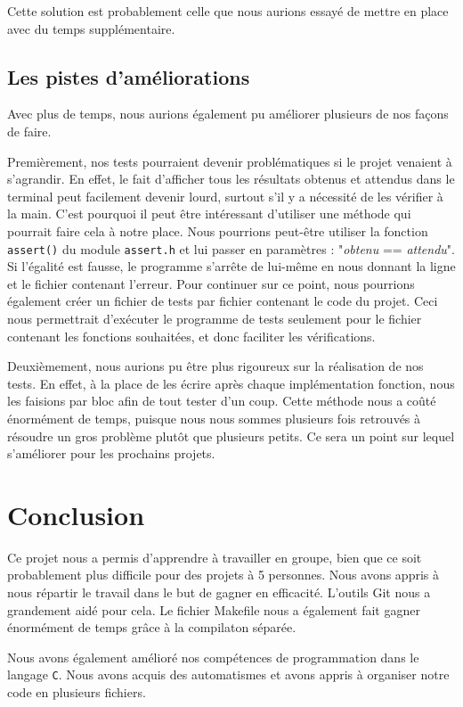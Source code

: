 \documentclass[a4paper]{article}
\begin{document}
Cette solution est probablement celle que nous aurions essayé de mettre en place avec du temps supplémentaire.

\subsection{Les pistes d'améliorations}
\label{amélio}

Avec plus de temps, nous aurions également pu améliorer plusieurs de nos façons de faire.

Premièrement, nos tests pourraient devenir problématiques si le projet venaient à s'agrandir. En effet, le fait d'afficher tous les résultats obtenus et attendus dans le terminal peut facilement devenir lourd, surtout s'il y a nécessité de les vérifier à la main. C'est pourquoi il peut être intéressant d'utiliser une méthode qui pourrait faire cela à notre place. Nous pourrions peut-être utiliser la fonction \verb|assert()| du module \verb|assert.h| et lui passer en paramètres : "\emph{obtenu} == \emph{attendu}". Si l'égalité est fausse, le programme s'arrête de lui-même en nous donnant la ligne et le fichier contenant l'erreur. Pour continuer sur ce point, nous pourrions également créer un fichier de tests par fichier contenant le code du projet. Ceci nous permettrait d'exécuter le programme de tests seulement pour le fichier contenant les fonctions souhaitées, et donc faciliter les vérifications.

Deuxièmement, nous aurions pu être plus rigoureux sur la réalisation de nos tests. En effet, à la place de les écrire après chaque implémentation fonction, nous les faisions par bloc afin de tout tester d'un coup. Cette méthode nous a coûté énormément de temps, puisque nous nous sommes plusieurs fois retrouvés à résoudre un gros problème plutôt que plusieurs petits. Ce sera un point sur lequel s'améliorer pour les prochains projets.

\section{Conclusion}

Ce projet nous a permis d'apprendre à travailler en groupe, bien que ce soit probablement plus difficile pour des projets à 5 personnes. Nous avons appris à nous répartir le travail dans le but de gagner en efficacité. L'outils Git nous a grandement aidé pour cela. Le fichier Makefile nous a également fait gagner énormément de temps grâce à la compilaton séparée.

Nous avons également amélioré nos compétences de programmation dans le langage \verb|C|. Nous avons acquis des automatismes et avons appris à organiser notre code en plusieurs fichiers.
\end{document}
